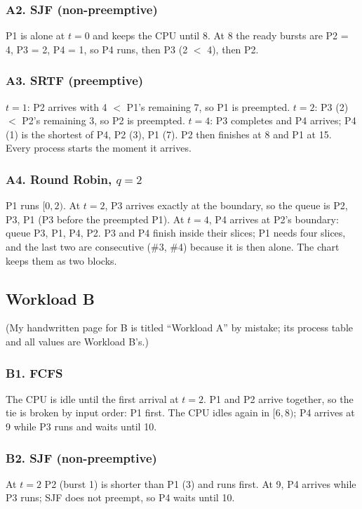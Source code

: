 \documentclass[11pt,a4paper]{article}
\begin{document}
\subsubsection*{A2. SJF (non-preemptive)}
P1 is alone at $t=0$ and keeps the CPU until 8. At 8 the ready bursts are P2 = 4, P3 = 2, P4 = 1, so P4 runs, then
P3 (2 $<$ 4), then P2.


\subsubsection*{A3. SRTF (preemptive)}
$t=1$: P2 arrives with 4 $<$ P1's remaining 7, so P1 is preempted. $t=2$: P3 (2) $<$ P2's remaining 3, so P2 is
preempted. $t=4$: P3 completes and P4 arrives; P4 (1) is the shortest of P4, P2 (3), P1 (7). P2 then finishes at 8 and
P1 at 15. Every process starts the moment it arrives.


\subsubsection*{A4. Round Robin, $q=2$}
P1 runs $[0,2)$. At $t=2$, P3 arrives exactly at the boundary, so the queue is P2, P3, P1 (P3 before the preempted P1).
At $t=4$, P4 arrives at P2's boundary: queue P3, P1, P4, P2. P3 and P4 finish inside their slices; P1 needs four slices,
and the last two are consecutive (\#3, \#4) because it is then alone. The chart keeps them as two blocks.


\subsection{Workload B}
\begin{center}\end{center}
(My handwritten page for B is titled ``Workload A'' by mistake; its process table and all values are Workload B's.)

\subsubsection*{B1. FCFS}
The CPU is idle until the first arrival at $t=2$. P1 and P2 arrive together, so the tie is broken by input order: P1
first. The CPU idles again in $[6,8)$; P4 arrives at 9 while P3 runs and waits until 10.


\subsubsection*{B2. SJF (non-preemptive)}
At $t=2$ P2 (burst 1) is shorter than P1 (3) and runs first. At 9, P4 arrives while P3 runs; SJF does not preempt, so P4
waits until 10.

\end{document}
